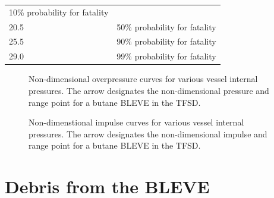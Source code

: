 \documentclass[10pt,parskip=half,
toc=sectionentrywithdots,
bibliography=totocnumbered,
captions=tableheading,numbers=noendperiod]{scrartcl}
\begin{document}
\begin{longtable}[]{@{}ll@{}}
\begin{minipage}[t]{0.38\columnwidth}
10\% probability for fatality\strut
\end{minipage}\tabularnewline
\begin{minipage}[t]{0.24\columnwidth}\raggedright
20.5\strut
\end{minipage} & \begin{minipage}[t]{0.38\columnwidth}\raggedright
50\% probability for fatality\strut
\end{minipage}\tabularnewline
\begin{minipage}[t]{0.24\columnwidth}\raggedright
25.5\strut
\end{minipage} & \begin{minipage}[t]{0.38\columnwidth}\raggedright
90\% probability for fatality\strut
\end{minipage}\tabularnewline
\begin{minipage}[t]{0.24\columnwidth}\raggedright
29.0\strut
\end{minipage} & \begin{minipage}[t]{0.38\columnwidth}\raggedright
99\% probability for fatality\strut
\end{minipage}\tabularnewline
\bottomrule
\end{longtable}

\begin{figure}[H]\begin{center}\end{center}\caption{Non-dimensional overpressure curves for various vessel internal
pressures. The arrow designates the non-dimensional pressure and range
point for a butane BLEVE in the TFSD.}\label{fig:overpressure}\end{figure}

\begin{figure}[H]\begin{center}\end{center}\caption{Non-dimenstional impulse curves for various vessel internal pressures.
The arrow designates the non-dimensional impulse and range point for a
butane BLEVE in the TFSD.}\label{fig:impulse}\end{figure}

\hypertarget{debris-from-the-bleve}{%
\section{Debris from the BLEVE}\label{debris-from-the-bleve}}
\end{document}
